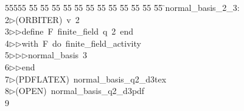 %
%
\begin{tabbing}
55555 \= 55 \= 55 \= 55 \= 55 \= 55 \= 55 \= 55 \= 55 \= 55 \= 55 \= 55 \= 55 \= \>normal\_basis\_2\_3:\\[0pt]
2\>$\triangleright$\>(ORBITER)\ v\ 2\ \\[0pt]
3\>$\triangleright$\>$\triangleright$\>define\ F\ finite\_field\ q\ 2\ end\ \\[0pt]
4\>$\triangleright$\>$\triangleright$\>with\ F\ do\ finite\_field\_activity\ \\[0pt]
5\>$\triangleright$\>$\triangleright$\>$\triangleright$\>normal\_basis\ 3\ \\[0pt]
6\>$\triangleright$\>$\triangleright$\>end\\[0pt]
7\>$\triangleright$\>(PDFLATEX)\ normal\_basis\_q2\_d3tex\\[0pt]
8\>$\triangleright$\>(OPEN)\ normal\_basis\_q2\_d3pdf\\[0pt]
9\>\end{tabbing}
